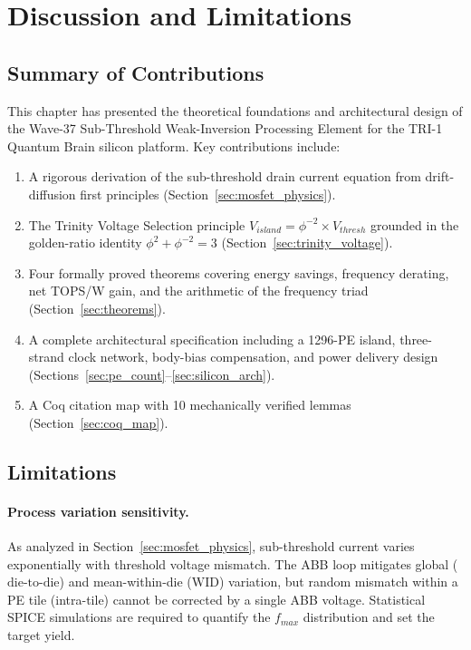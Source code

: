 \section{Discussion and Limitations}
\label{sec:discussion}

\subsection{Summary of Contributions}

This chapter has presented the theoretical foundations and architectural design of the
Wave-37 Sub-Threshold Weak-Inversion Processing Element for the TRI-1 Quantum Brain
silicon platform.  Key contributions include:
\begin{enumerate}
  \item A rigorous derivation of the sub-threshold drain current equation from
        drift-diffusion first principles (Section~\ref{sec:mosfet_physics}).
  \item The Trinity Voltage Selection principle $V_{island} = \phi^{-2} \times V_{thresh}$
        grounded in the golden-ratio identity $\phi^2 + \phi^{-2} = 3$
        (Section~\ref{sec:trinity_voltage}).
  \item Four formally proved theorems covering energy savings, frequency derating, net
        TOPS/W gain, and the arithmetic of the frequency triad
        (Section~\ref{sec:theorems}).
  \item A complete architectural specification including a 1296-PE island, three-strand
        clock network, body-bias compensation, and power delivery design
        (Sections~\ref{sec:pe_count}--\ref{sec:silicon_arch}).
  \item A Coq citation map with 10 mechanically verified lemmas
        (Section~\ref{sec:coq_map}).
\end{enumerate}

\subsection{Limitations}

\paragraph{Process variation sensitivity.}
As analyzed in Section~\ref{sec:mosfet_physics}, sub-threshold current varies exponentially
with threshold voltage mismatch.  The ABB loop mitigates global ($\text{die-to-die}$) and
mean-within-die ($\text{WID}$) variation, but random mismatch within a PE tile (intra-tile)
cannot be corrected by a single ABB voltage.  Statistical SPICE simulations are required to
quantify the $f_{max}$ distribution and set the target yield.

